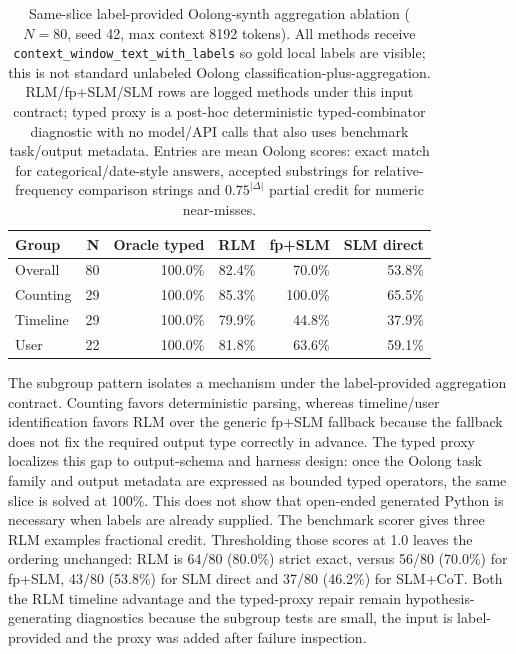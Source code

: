 \begin{table}[!t]
\centering
\small
\setlength{\tabcolsep}{3pt}
\begin{tabular}{@{}p{6.0cm}rrrrr@{}}
\toprule
\textbf{Group} & \textbf{N} & \textbf{Oracle typed} & \textbf{RLM} & \textbf{fp+SLM} & \textbf{SLM direct} \\
\midrule
Overall & 80 & 100.0\% & 82.4\% & 70.0\% & 53.8\% \\
Counting & 29 & 100.0\% & 85.3\% & 100.0\% & 65.5\% \\
Timeline & 29 & 100.0\% & 79.9\% & 44.8\% & 37.9\% \\
User & 22 & 100.0\% & 81.8\% & 63.6\% & 59.1\% \\
\bottomrule
\end{tabular}
\caption{Same-slice label-provided Oolong-synth aggregation ablation ($N=80$, seed 42, max context 8192 tokens). All methods receive \texttt{context\_window\_text\_with\_labels} so gold local labels are visible; this is not standard unlabeled Oolong classification-plus-aggregation. RLM/fp+SLM/SLM rows are logged methods under this input contract; typed proxy is a post-hoc deterministic typed-combinator diagnostic with no model/API calls that also uses benchmark task/output metadata. Entries are mean Oolong scores: exact match for categorical/date-style answers, accepted substrings for relative-frequency comparison strings and $0.75^{|\Delta|}$ partial credit for numeric near-misses.}
\label{tab:supp-oolong}
\end{table}

The subgroup pattern isolates a mechanism under the label-provided aggregation contract. Counting favors deterministic parsing, whereas timeline/user identification favors RLM over the generic fp+SLM fallback because the fallback does not fix the required output type correctly in advance. The typed proxy localizes this gap to output-schema and harness design: once the Oolong task family and output metadata are expressed as bounded typed operators, the same slice is solved at 100\%. This does not show that open-ended generated Python is necessary when labels are already supplied. The benchmark scorer gives three RLM examples fractional credit. Thresholding those scores at 1.0 leaves the ordering unchanged: RLM is 64/80 (80.0\%) strict exact, versus 56/80 (70.0\%) for fp+SLM, 43/80 (53.8\%) for SLM direct and 37/80 (46.2\%) for SLM+CoT. Both the RLM timeline advantage and the typed-proxy repair remain hypothesis-generating diagnostics because the subgroup tests are small, the input is label-provided and the proxy was added after failure inspection.

